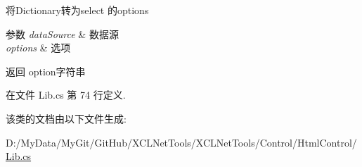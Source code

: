 将\-Dictionary转为select 的options 


\begin{DoxyParams}{参数}
{\em data\-Source} & 数据源\\
\hline
{\em options} & 选项\\
\hline
\end{DoxyParams}
\begin{DoxyReturn}{返回}
option字符串
\end{DoxyReturn}


在文件 Lib.\-cs 第 74 行定义.



该类的文档由以下文件生成\-:\begin{DoxyCompactItemize}
\item 
D\-:/\-My\-Data/\-My\-Git/\-Git\-Hub/\-X\-C\-L\-Net\-Tools/\-X\-C\-L\-Net\-Tools/\-Control/\-Html\-Control/\hyperlink{_control_2_html_control_2_lib_8cs}{Lib.\-cs}\end{DoxyCompactItemize}
